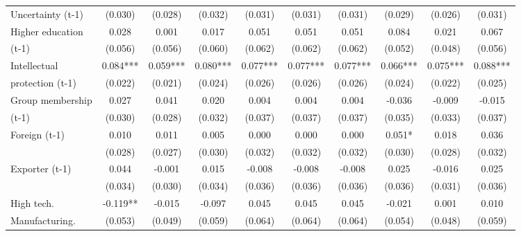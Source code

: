 \begin{table}[htbp]
\begin{tabular}{l*{9}{c}}
Uncertainty (t-1)   &     (0.030)   &     (0.028)   &     (0.032)   &     (0.031)   &     (0.031)   &     (0.031)   &     (0.029)   &     (0.026)   &     (0.031)   \\
Higher education    &       0.028   &       0.001   &       0.017   &       0.051   &       0.051   &       0.051   &       0.084   &       0.021   &       0.067   \\
(t-1)               &     (0.056)   &     (0.056)   &     (0.060)   &     (0.062)   &     (0.062)   &     (0.062)   &     (0.052)   &     (0.048)   &     (0.056)   \\
Intellectual        &       0.084***&       0.059***&       0.080***&       0.077***&       0.077***&       0.077***&       0.066***&       0.075***&       0.088***\\
protection (t-1)    &     (0.022)   &     (0.021)   &     (0.024)   &     (0.026)   &     (0.026)   &     (0.026)   &     (0.024)   &     (0.022)   &     (0.025)   \\
Group membership    &       0.027   &       0.041   &       0.020   &       0.004   &       0.004   &       0.004   &      -0.036   &      -0.009   &      -0.015   \\
(t-1)               &     (0.030)   &     (0.028)   &     (0.032)   &     (0.037)   &     (0.037)   &     (0.037)   &     (0.035)   &     (0.033)   &     (0.037)   \\
Foreign (t-1)       &       0.010   &       0.011   &       0.005   &       0.000   &       0.000   &       0.000   &       0.051*  &       0.018   &       0.036   \\
                    &     (0.028)   &     (0.027)   &     (0.030)   &     (0.032)   &     (0.032)   &     (0.032)   &     (0.030)   &     (0.028)   &     (0.032)   \\
Exporter (t-1)      &       0.044   &      -0.001   &       0.015   &      -0.008   &      -0.008   &      -0.008   &       0.025   &      -0.016   &       0.025   \\
                    &     (0.034)   &     (0.030)   &     (0.034)   &     (0.036)   &     (0.036)   &     (0.036)   &     (0.036)   &     (0.031)   &     (0.036)   \\
High tech.          &      -0.119** &      -0.015   &      -0.097   &       0.045   &       0.045   &       0.045   &      -0.021   &       0.001   &       0.010   \\
Manufacturing.      &     (0.053)   &     (0.049)   &     (0.059)   &     (0.064)   &     (0.064)   &     (0.064)   &     (0.054)   &     (0.048)   &     (0.059)   \\

\end{tabular}
\end{table}
